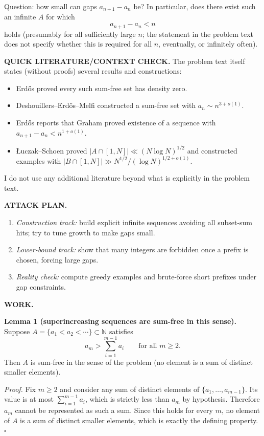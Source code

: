 Question: how small can gaps $a_{n+1}-a_n$ be? In particular, does there exist such an infinite $A$ for which
\[
 a_{n+1}-a_n < n
\]
holds (presumably for all sufficiently large $n$; the statement in the problem text does not specify whether this is required for all $n$, eventually, or infinitely often).

\medskip
\noindent\textbf{QUICK LITERATURE/CONTEXT CHECK.}
The problem text itself states (without proofs) several results and constructions:
\begin{itemize}
\item Erd\H{o}s proved every such sum-free set has density zero.
\item Deshouillers--Erd\H{o}s--Melfi constructed a sum-free set with $a_n\sim n^{3+o(1)}$.
\item Erd\H{o}s reports that Graham proved existence of a sequence with $a_{n+1}-a_n<n^{1+o(1)}$.
\item \L uczak--Schoen proved $|A\cap[1,N]|\ll (N\log N)^{1/2}$ and constructed examples with $|B\cap[1,N]|\gg N^{1/2}/(\log N)^{1/2+o(1)}$.
\end{itemize}
I do not use any additional literature beyond what is explicitly in the problem text.

\medskip
\noindent\textbf{ATTACK PLAN.}
\begin{enumerate}
\item \emph{Construction track:} build explicit infinite sequences avoiding all subset-sum hits; try to tune growth to make gaps small.
\item \emph{Lower-bound track:} show that many integers are forbidden once a prefix is chosen, forcing large gaps.
\item \emph{Reality check:} compute greedy examples and brute-force short prefixes under gap constraints.
\end{enumerate}

\medskip
\noindent\textbf{WORK.}

\noindent\textbf{Lemma 1 (superincreasing sequences are sum-free in this sense).}
Suppose $A=\{a_1<a_2<\cdots\}\subset\mathbb N$ satisfies
\[
 a_{m} > \sum_{i=1}^{m-1} a_i\qquad\text{for all }m\ge 2.
\]
Then $A$ is sum-free in the sense of the problem (no element is a sum of distinct smaller elements).

\noindent\emph{Proof.}
Fix $m\ge 2$ and consider any sum of distinct elements of $\{a_1,\dots,a_{m-1}\}$. Its value is at most $\sum_{i=1}^{m-1} a_i$, which is strictly less than $a_m$ by hypothesis. Therefore $a_m$ cannot be represented as such a sum.
Since this holds for every $m$, no element of $A$ is a sum of distinct smaller elements, which is exactly the defining property.
\hfill$\square$

